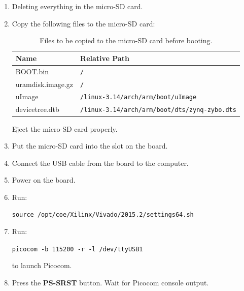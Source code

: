 \documentclass[11pt,letterpaper,titlepage]{article}
\begin{document}
\begin{enumerate}
\begin{enumerate}
        \item Deleting everything in the micro-SD card.
        
        \item Copy the following files to the micro-SD card:
        
        \begin{table}[ht]
        \centering
        \begin{tabular}{@{}ll@{}}
        \toprule
        Name              & Relative Path                               \\ \midrule
        BOOT.bin          & \verb|/|                                           \\ \midrule
        uramdisk.image.gz & \verb|/|                                           \\ \midrule
        uImage            & \verb|/linux-3.14/arch/arm/boot/uImage|            \\ \midrule
        devicetree.dtb    & \verb|/linux-3.14/arch/arm/boot/dts/zynq-zybo.dts| \\ \bottomrule
        \end{tabular}
        \caption{Files to be copied to the micro-SD card before booting.}
        \end{table}
        
        Eject the micro-SD card properly.
        
        \item Put the micro-SD card into the slot on the board.
        
        \item Connect the USB cable from the board to the computer.
        
        \item Power on the board.
        
        \item Run:
        
        \verb|source /opt/coe/Xilinx/Vivado/2015.2/settings64.sh|
        
        \item Run:
        
        \verb|picocom -b 115200 -r -l /dev/ttyUSB1|
        
        to launch Picocom.
        
        \item Press the \textbf{PS-SRST} button. Wait for Picocom console output.
        
    \end{enumerate}
    
\end{enumerate}
\end{document}
